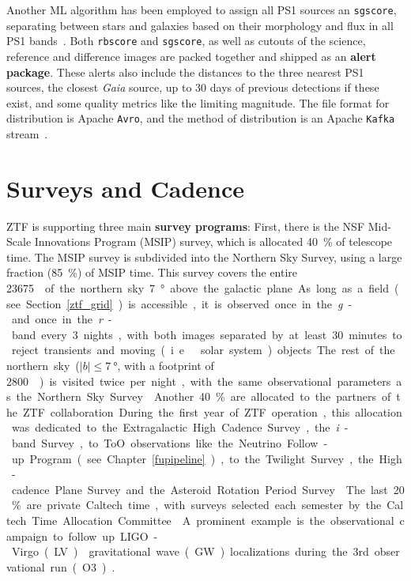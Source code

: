 Another ML algorithm has been employed to assign all PS1 sources an \texttt{sgscore}, separating between stars and galaxies based on their morphology and flux in all PS1 bands~. Both \texttt{rbscore} and \texttt{sgscore}, as well as cutouts of the science, reference and difference images are packed together and shipped as an \textbf{alert package}. These alerts also include the distances to the three nearest PS1 sources, the closest \textit{Gaia} source, up to 30 days of previous detections if these exist, and some quality metrics like the limiting magnitude. The file format for distribution is Apache \texttt{Avro}, and the method of distribution is an Apache \texttt{Kafka} stream~.

\section{Surveys and Cadence}\label{surveys}
ZTF is supporting three main \textbf{survey programs}: First, there is the NSF Mid-Scale Innovations Program (MSIP) survey, which is allocated \SI{40}{\percent} of telescope time. The MSIP survey is subdivided into the Northern Sky Survey, using a large fraction (\SI{85}{\percent}) of MSIP time. This survey covers the entire \SI{23675}{\square\deg} of the northern sky \SI{7}{\degree} above the galactic plane. As long as a field (see Section~\ref{ztf_grid}) is accessible, it is observed once in the \textit{g}- and once in the \textit{r}-band every 3 nights, with both images separated by at least 30 minutes to reject transients and moving (i.e.\ solar system) objects. The rest of the northern sky ($|b|\leq \SI{7}{\degree}$, with a footprint of \SI{2800}{\square\deg}) is visited twice per night, with the same observational parameters as the Northern Sky Survey~\cite{Bellm2019a}.

Another \SI{40}{\percent} are allocated to the partners of the ZTF collaboration. During the first year of ZTF operation, this allocation was dedicated to the Extragalactic High Cadence Survey, the \textit{i}-band Survey, to ToO observations like the Neutrino Follow-up Program (see Chapter~\ref{fupipeline}), to the Twilight Survey, the High-cadence Plane Survey and the Asteroid Rotation Period Survey~\cite{Bellm2019a}.

The last \SI{20}{\percent} are private Caltech time, with surveys selected each semester by the Caltech Time Allocation Committee~\cite{Bellm2019a}. A prominent example is the observational campaign to follow up
LIGO-Virgo (LV)~ gravitational wave (GW) localizations during the 3rd observational run (O3)~.
